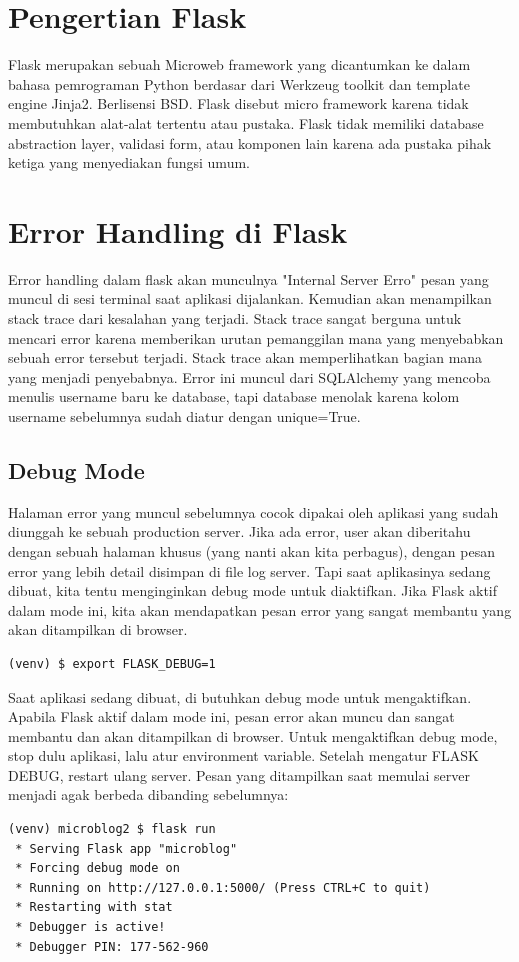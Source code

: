 
\section{Pengertian Flask}
Flask merupakan sebuah Microweb framework yang dicantumkan ke dalam bahasa pemrograman Python berdasar dari Werkzeug toolkit dan template engine Jinja2. Berlisensi BSD. Flask disebut micro framework karena tidak membutuhkan alat-alat tertentu atau pustaka. Flask tidak memiliki database abstraction layer, validasi form, atau komponen lain karena ada pustaka pihak ketiga yang menyediakan fungsi umum.

\section{Error Handling di Flask}
Error handling dalam flask akan munculnya "Internal Server Erro" pesan yang muncul di sesi terminal saat aplikasi dijalankan. Kemudian akan menampilkan  stack trace dari kesalahan yang terjadi. Stack trace sangat berguna untuk mencari error karena memberikan urutan pemanggilan mana yang menyebabkan sebuah error tersebut terjadi. Stack trace akan memperlihatkan bagian mana yang menjadi penyebabnya. Error ini muncul dari SQLAlchemy yang mencoba menulis username baru ke database, tapi database menolak karena kolom username sebelumnya sudah diatur dengan unique=True.

\subsection{Debug Mode}
Halaman error yang muncul sebelumnya cocok dipakai oleh aplikasi yang sudah diunggah ke sebuah production server. Jika ada error, user akan diberitahu dengan sebuah halaman khusus (yang nanti akan kita perbagus), dengan pesan error yang lebih detail disimpan di file log server.
Tapi saat aplikasinya sedang dibuat, kita tentu menginginkan debug mode untuk diaktifkan. Jika Flask aktif dalam mode ini, kita akan mendapatkan pesan error yang sangat membantu yang akan ditampilkan di browser.

\begin{verbatim}
(venv) $ export FLASK_DEBUG=1
\end{verbatim}

Saat aplikasi sedang dibuat, di butuhkan debug mode untuk mengaktifkan. Apabila Flask aktif dalam mode ini,  pesan error akan muncu dan sangat membantu dan akan ditampilkan di browser. Untuk mengaktifkan debug mode, stop dulu aplikasi, lalu atur environment variable. 
Setelah mengatur FLASK DEBUG, restart ulang server. Pesan yang ditampilkan saat memulai server menjadi agak berbeda dibanding sebelumnya:
\begin{verbatim}
(venv) microblog2 $ flask run
 * Serving Flask app "microblog"
 * Forcing debug mode on
 * Running on http://127.0.0.1:5000/ (Press CTRL+C to quit)
 * Restarting with stat
 * Debugger is active!
 * Debugger PIN: 177-562-960
 \end{verbatim}
 
